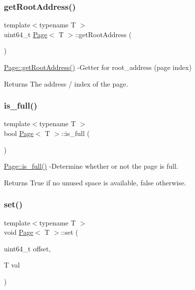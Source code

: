 \subsubsection{\texorpdfstring{get\+Root\+Address()}{getRootAddress()}}
{\footnotesize\ttfamily template$<$typename T $>$ \\
uint64\+\_\+t \hyperlink{class_page}{Page}$<$ T $>$\+::get\+Root\+Address (\begin{DoxyParamCaption}{ }\end{DoxyParamCaption})}

\hyperlink{class_page_a438a928e0ce67dc404f183678eb533ec}{Page\+::get\+Root\+Address()} -\/\+Getter for root\+\_\+address (page index) \begin{DoxyReturn}{Returns}
The address / index of the page. 
\end{DoxyReturn}
\mbox{\label{class_page_a8c27abd6fb2ce55c05b065584b4bcc75}} 
\subsubsection{\texorpdfstring{is\+\_\+full()}{is\_full()}}
{\footnotesize\ttfamily template$<$typename T $>$ \\
bool \hyperlink{class_page}{Page}$<$ T $>$\+::is\+\_\+full (\begin{DoxyParamCaption}{ }\end{DoxyParamCaption})}

\hyperlink{class_page_a8c27abd6fb2ce55c05b065584b4bcc75}{Page\+::is\+\_\+full()} -\/\+Determine whether or not the page is full. \begin{DoxyReturn}{Returns}
True if no unused space is available, false otherwise. 
\end{DoxyReturn}
\mbox{\label{class_page_a4de67b2afdfe14758388f745a8a99d56}} 
\subsubsection{\texorpdfstring{set()}{set()}}
{\footnotesize\ttfamily template$<$typename T $>$ \\
void \hyperlink{class_page}{Page}$<$ T $>$\+::set (\begin{DoxyParamCaption}\item[{uint64\+\_\+t}]{offset,  }\item[{T}]{val }\end{DoxyParamCaption})}

